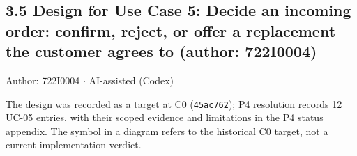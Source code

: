\subsection*{3.5 Design for Use Case 5: Decide an incoming order: confirm, reject, or offer a replacement the customer agrees to (author: 722I0004)}
Author: 722I0004 \ensuremath{\cdot} AI-assisted (Codex)

The design was recorded as a target at C0 (\texttt{45ac762}); P4 resolution records 12 UC-05 entries, with their scoped evidence and limitations in the P4 status appendix. The \textdagger{} symbol in a diagram refers to the historical C0 target, not a current implementation verdict.

